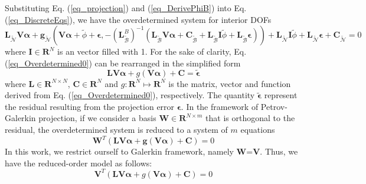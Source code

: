\documentclass[preprint, 10pt]{elsarticle}
\begin{document}
Substituting Eq. (\ref{eq_projection}) and (\ref{eq_DerivePhiB}) into Eq. (\ref{eq_DiscreteEqs}), we have the overdetermined system for interior
DOFs
\begin{equation}
\mathbf{L}_{\widetilde {\mathcal{N}}} \mathbf{V} \pmb{\alpha}
+\mathbf{g}_{\widetilde {\mathcal{N}}}
\left( \mathbf{V} \pmb{\alpha} + \tilde{\phi} + \pmb{\epsilon}, -\left( \mathbf{L}_{\widetilde {\mathcal{B}}}^{B} \right)^{-1}
\left(
\mathbf{L}_{\widetilde {\mathcal{B}}} \mathbf{V} \pmb{\alpha} +
\mathbf{C}_{\widetilde {\mathcal{B}}} + \mathbf{L}_{\widetilde {\mathcal{B}}} \mathbf{I} \tilde{\phi} + \mathbf{L}_{\widetilde {\mathcal{B}}} \pmb{\epsilon}
\right) \right)
+\mathbf{L}_{\widetilde {\mathcal{N}}} \mathbf{I} \tilde{\phi}
+\mathbf{L}_{\widetilde {\mathcal{N}}} \pmb{\epsilon}
+ \mathbf{C}_{\widetilde {\mathcal{N}}}
= 0
\label{eq_Overdetermined0}
\end{equation}
where $\mathbf{I} \in \mathbf{R}^{N}$ is an vector filled with 1. For the sake of clarity, Eq. (\ref{eq_Overdetermined0}) can be rearranged in the simplified form
\begin{equation}
 \mathbf{L} \mathbf{V} \pmb{\alpha}
+ g         \left( \mathbf{V} \pmb{\alpha} \right)
+\mathbf{C}
= \tilde{ \pmb{\epsilon} }
\label{eq_Overdetermined1}
\end{equation}
where $\mathbf{L} \in \mathbf{R}^{N \times N}$, $\mathbf{C} \in \mathbf{R}^{N}$ and $g: \mathbf{R}^N \mapsto \mathbf{R}^N$ is the matrix, vector and function derived from Eq. (\ref{eq_Overdetermined0}), respectively.
The quantity $\tilde{ \pmb{\epsilon} }$ represent the residual resulting from the projection error $\pmb{\epsilon}$.
In the framework of Petrov-Galerkin projection, if we consider a basis $\mathbf{W} \in \mathbf{R}^{N \times m}$ that is orthogonal to the residual,  the overdetermined system is reduced to a system of $m$ equations
\begin{equation}
\mathbf{W}^T
\left(
 \mathbf{L} \mathbf{V} \pmb{\alpha}
+\mathbf{g} \left( \mathbf{V} \pmb{\alpha} \right)
+\mathbf{C}
\right)
=0
\label{eq_Petrov}
\end{equation}
In this work, we restrict ourself to Galerkin framework, namely $\mathbf{W}$=$\mathbf{V}$.
Thus, we have the reduced-order model as follows:
\begin{equation}
\mathbf{V}^T
\left(
 \mathbf{L} \mathbf{V} \pmb{\alpha}
+ g         \left( \mathbf{V} \pmb{\alpha} \right)
+\mathbf{C}
\right)
=0
\label{eq_Galerkin}
\end{equation}
\end{document}
